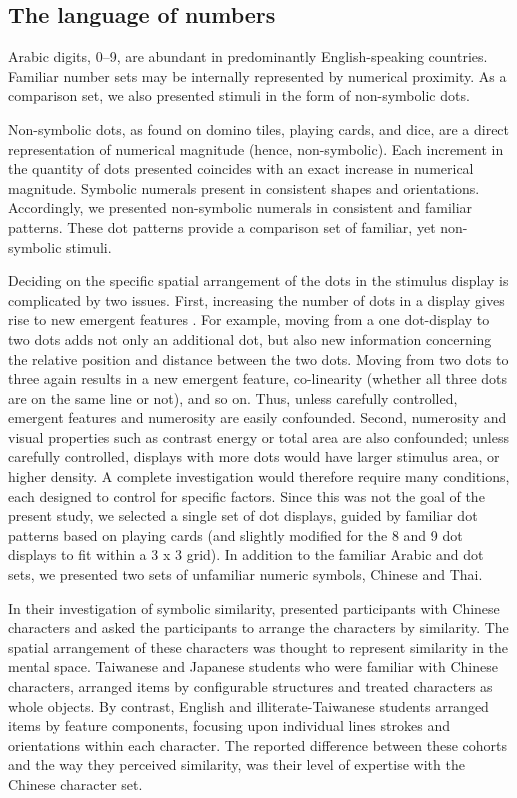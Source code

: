\subsection{The language of numbers}
Arabic digits, 0--9, are abundant in predominantly English-speaking countries. Familiar number sets may be internally represented by numerical proximity. As a comparison set, we also presented stimuli in the form of non-symbolic dots.

Non-symbolic dots, as found on domino tiles, playing cards, and dice, are a direct representation of numerical magnitude (hence, non-symbolic). Each increment in the quantity of dots presented coincides with an exact increase in numerical magnitude. Symbolic numerals present in consistent shapes and orientations. Accordingly, we presented non-symbolic numerals in consistent and familiar patterns. These dot patterns provide a comparison set of familiar, yet non-symbolic stimuli. 

Deciding on the specific spatial arrangement of the dots in the stimulus display is complicated by two issues. First, increasing the number of dots in a display gives rise to new emergent features \cite{pomerantz2011grouping, hawkins2016can}. For example, moving from a one dot-display to two dots adds not only an additional dot, but also new information concerning the relative position and distance between the two dots. Moving from two dots to three again results in a new emergent feature, co-linearity (whether all three dots are on the same line or not), and so on. Thus, unless carefully controlled, emergent features and numerosity are easily confounded. Second, numerosity and visual properties such as contrast energy or total area are also confounded; unless carefully controlled, displays with more dots would have larger stimulus area, or higher density. A complete investigation would therefore require many conditions, each designed to control for specific factors. Since this was not the goal of the present study, we selected a single set of dot displays, guided by familiar dot patterns based on playing cards (and slightly modified for the 8 and 9 dot displays to fit within a 3 x 3 grid). In addition to the familiar Arabic and dot sets, we presented two sets of unfamiliar numeric symbols, Chinese and Thai.

In their investigation of symbolic similarity,  presented participants with Chinese characters and asked the participants to arrange the characters by similarity. The spatial arrangement of these characters was thought to represent similarity in the mental space. Taiwanese and Japanese students who were familiar with Chinese characters, arranged items by configurable structures and treated characters as whole objects. By contrast, English and illiterate-Taiwanese students arranged items by feature components, focusing upon individual lines strokes and orientations within each character. The reported difference between these cohorts and the way they perceived similarity, was their level of expertise with the Chinese character set. 

